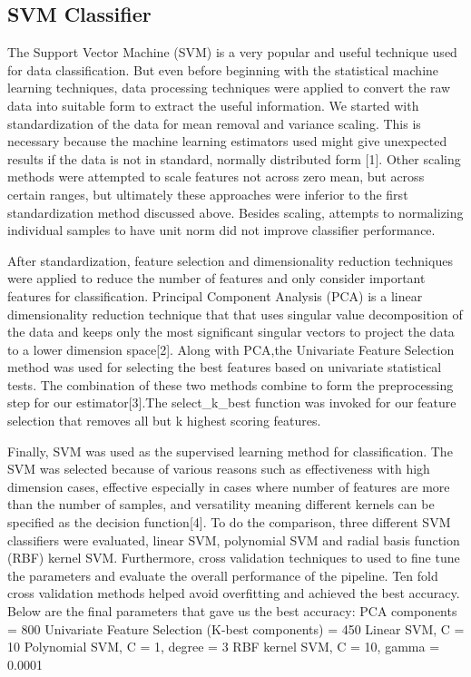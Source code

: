 \documentclass{article} %
\begin{document}
\subsection{SVM Classifier}
The Support Vector Machine (SVM) is a very popular and useful technique used for data classification. But even before beginning with the statistical machine learning techniques, data processing techniques were applied to convert the raw data into suitable form to extract the useful information. We started with standardization of the data for mean removal and variance scaling. This is necessary because the machine learning estimators used might give unexpected results if the data is not in standard, normally distributed form [1]. Other scaling methods were attempted to scale features not across zero mean, but across certain ranges, but ultimately these approaches were inferior to the first standardization method discussed above. Besides scaling, attempts to normalizing individual samples to have unit norm did not improve classifier performance. 

After standardization, feature selection and dimensionality reduction techniques were applied to reduce the number of features and only consider important features for classification. Principal Component Analysis (PCA) is a linear dimensionality reduction technique that that uses singular value decomposition of the data and keeps only the most significant singular vectors to project the data to a lower dimension space[2]. Along with PCA,the Univariate Feature Selection method was used for selecting the best features based on univariate statistical tests. The combination of these two methods combine to form the preprocessing step for our estimator[3].The select\_k\_best function was invoked for our feature selection that removes all but k highest scoring features.

Finally, SVM was used as the supervised learning method for classification. The SVM was selected because of various reasons such as effectiveness with high dimension cases, effective especially in cases where number of features are more than the number of samples, and versatility meaning different kernels can be specified as the decision function[4]. To do the comparison, three different SVM classifiers were evaluated, linear SVM, polynomial SVM and radial basis function (RBF) kernel SVM. Furthermore, cross validation techniques to used to fine tune the parameters and evaluate the overall performance of the pipeline. Ten fold cross validation methods helped avoid overfitting and achieved the best accuracy. Below are the final parameters that gave us the best accuracy:
PCA components = 800
Univariate Feature Selection (K-best components) = 450
Linear SVM, C = 10
Polynomial SVM, C = 1, degree = 3
RBF kernel SVM, C = 10, gamma = 0.0001
\end{document}
